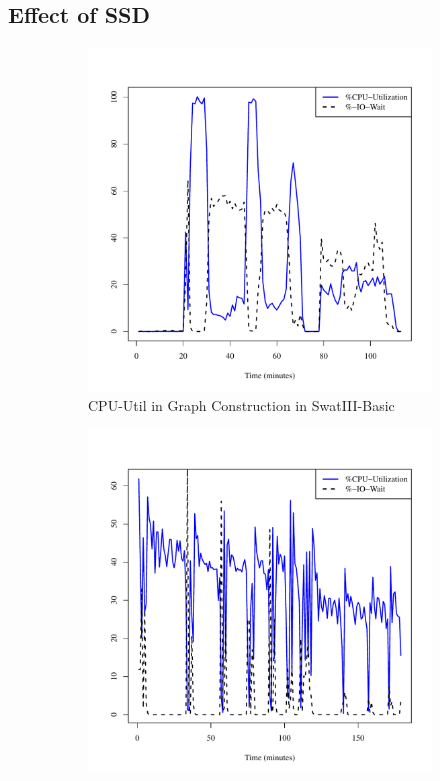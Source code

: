 \documentclass[conference]{IEEEtran}
\begin{document}
\subsection {Effect of SSD} \label{EffectOfSSD}
\begin{figure}[]
\centering
        \begin{subfigure}[b]{0.25\textwidth}
                \includegraphics[width=\textwidth]{Figure/SystemData/Plots/BGCPUHDD.pdf}
                \caption{CPU-Util in Graph Construction in SwatIII-Basic}
                \label{fig:BGCPUHDD}
        \end{subfigure}
		\begin{subfigure}[b]{0.25\textwidth}
                \includegraphics[width=\textwidth]{Figure/SystemData/Plots/ECCPUHDD.pdf}

\end{subfigure}
\end{figure}
\end{document}
